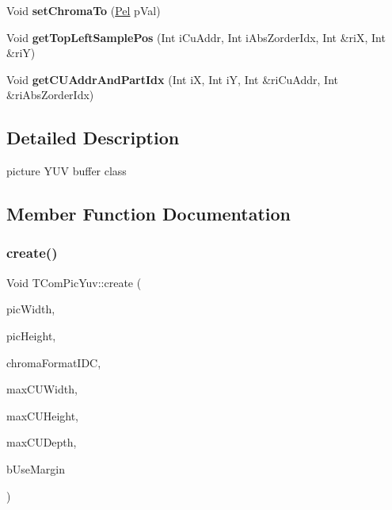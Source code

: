 \begin{DoxyCompactItemize}
Void {\bfseries set\+Chroma\+To} (\hyperlink{_type_def_8h_af92141699657699b4b547be0c8517541}{Pel} p\+Val)
\item 
\mbox{\label{class_t_com_pic_yuv_af87c8fd376f55702ba653e36bf80c893}} 
Void {\bfseries get\+Top\+Left\+Sample\+Pos} (Int i\+Cu\+Addr, Int i\+Abs\+Zorder\+Idx, Int \&riX, Int \&riY)
\item 
\mbox{\label{class_t_com_pic_yuv_a07f1cab6b1094c8543565ce4b2e10d97}} 
Void {\bfseries get\+C\+U\+Addr\+And\+Part\+Idx} (Int iX, Int iY, Int \&ri\+Cu\+Addr, Int \&ri\+Abs\+Zorder\+Idx)
\end{DoxyCompactItemize}


\subsection{Detailed Description}
picture Y\+UV buffer class 

\subsection{Member Function Documentation}
\mbox{\label{class_t_com_pic_yuv_a87b6364902cae5bd0284aa59087c2892}} 
\subsubsection{\texorpdfstring{create()}{create()}}
{\footnotesize\ttfamily Void T\+Com\+Pic\+Yuv\+::create (\begin{DoxyParamCaption}\item[{const Int}]{pic\+Width,  }\item[{const Int}]{pic\+Height,  }\item[{const \hyperlink{_type_def_8h_a4a6c51c10f2eb04abc7209db7caff39f}{Chroma\+Format}}]{chroma\+Format\+I\+DC,  }\item[{const U\+Int}]{max\+C\+U\+Width,  }\item[{const U\+Int}]{max\+C\+U\+Height,  }\item[{const U\+Int}]{max\+C\+U\+Depth,  }\item[{const Bool}]{b\+Use\+Margin }\end{DoxyParamCaption})}



